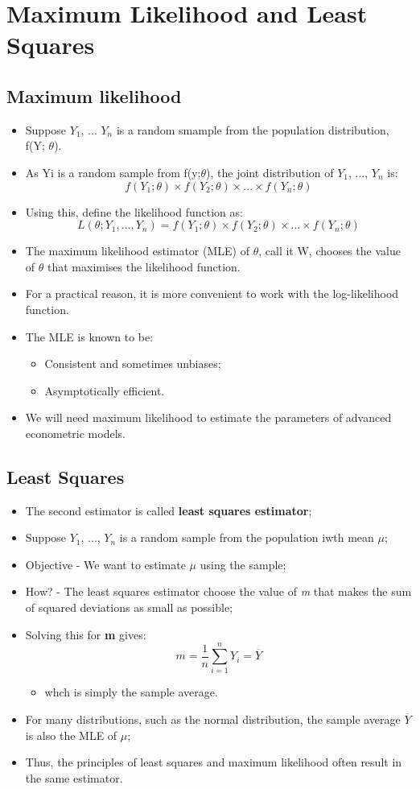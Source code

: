 \documentclass[11pt,a4paper]{report}
\begin{document}
\section{Maximum Likelihood and Least Squares}
\subsection{Maximum likelihood}
\begin{itemize}
    \item Suppose {$Y_1$, ... $Y_n$} is a random smample from the population distribution, f(Y; $\theta$).
    \item As Yi is a random sample from f(y;$\theta$), the joint distribution of {$Y_1$, ..., $Y_n$} is:
    \[f(Y_1;\theta) \times f(Y_2;\theta) \times ... \times f(Y_n; \theta)\]
    \item Using this, define the likelihood function as:
    \[L(\theta; Y_1, ..., Y_n) = f(Y_1;\theta) \times f(Y_2; \theta) \times ... \times f(Y_n; \theta)\]
    \item The maximum likelihood estimator (MLE) of $\theta$, call it W, chooses the value of $\theta$ that maximises the likelihood function.
    \item For a practical reason, it is more convenient to work with the log-likelihood function.
    \item The MLE is known to be:
    \begin{itemize}
        \item Consistent and sometimes unbiases;
        \item Asymptotically efficient.
    \end{itemize}
    \item We will need maximum likelihood to estimate the parameters of advanced econometric models.
\end{itemize}
\subsection{Least Squares}
\begin{itemize}
    \item The second estimator is called \textbf{least squares estimator};
    \item Suppose {$Y_1$, ..., $Y_n$ is a random sample from the population iwth mean $\mu$};
    \item Objective - We want to estimate $\mu$ using the sample;
    \item How? - The least squares estimator choose the value of \textit{m} that makes the sum of squared deviations as small as possible;
    \item Solving this for \textbf{m} gives:
    \[m = \frac{1}{n}\sum_{i=1}^{n}Y_i = \overline{Y}\]
    \begin{itemize}
        \item whch is simply the sample average.
    \end{itemize}
    \item For many distributions, such as the normal distribution, the sample average $\overline{Y}$ is also the MLE of $\mu$;
    \item Thus, the principles of least squares and maximum likelihood often result in the same estimator.
\end{itemize}
\end{document}
